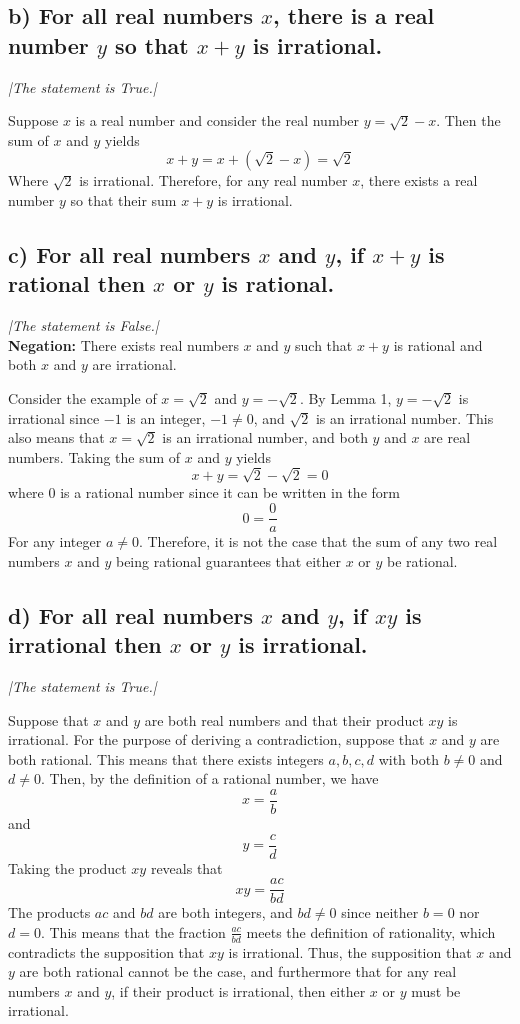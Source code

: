 \documentclass[11pt, letterpaper]{article}
\begin{document}
\subsection*{b) For all real numbers $x$, there is a real number $y$ so that $x+y$ is irrational.}
{\large\it |The statement is True.|}
\begin{prf}
    Suppose $x$ is a real number and consider the real number $y=\sqrt{2}-x$. Then the sum of $x$ and $y$ yields
    \[x+y=x+(\sqrt{2}-x)=\sqrt{2}\]
    Where $\sqrt{2}$ is irrational. Therefore, for any real number $x$, there exists a real number $y$ so that their sum
    $x+y$ is irrational.
\end{prf}

\subsection*{c) For all real numbers $x$ and $y$, if $x+y$ is rational then $x$ or $y$ is rational.}
{\large\it |The statement is False.|}\\[0.25cm]
{\bf Negation:} There exists real numbers $x$ and $y$ such that $x+y$ is rational and both $x$ and $y$ are irrational.
\begin{prf}
    Consider the example of $x=\sqrt{2}$ and $y=-\sqrt{2}$. By Lemma 1, $y=-\sqrt{2}$ is
    irrational since $-1$ is an integer, $-1\neq 0$, and $\sqrt{2}$ is an irrational number. This also means that $x=\sqrt{2}$ is 
    an irrational number, and both $y$ and $x$ are real numbers. Taking the sum of $x$ and $y$ yields
    \[x+y=\sqrt{2}-\sqrt{2}=0\]
    where 0 is a rational number since it can be written in the form
    \[0=\frac{0}{a}\]
    For any integer $a\neq 0$. Therefore, it is not the case that the sum of any two real numbers $x$ and $y$ being rational
    guarantees that either $x$ or $y$ be rational.
\end{prf}

\subsection*{d) For all real numbers $x$ and $y$, if $xy$ is irrational then $x$ or $y$ is irrational.}
{\large\it |The statement is True.|}
\begin{prf}[by contradiction]
    Suppose that $x$ and $y$ are both real numbers and that their product $xy$ is irrational. For the purpose of deriving a contradiction,
    suppose that $x$ and $y$ are both rational. This means that there exists integers $a,b,c,d$ with both $b\neq 0$ and $d\neq 0$.
    Then, by the definition of a rational number, we have
    \[x=\frac{a}{b}\]
    and 
    \[y=\frac{c}{d}\] 
    Taking the product $xy$ reveals that
    \[xy=\frac{ac}{bd}\] 
    The products $ac$ and $bd$ are both integers, and $bd\neq 0$ since neither $b=0$ nor $d=0$. This means that the fraction
    $\frac{ac}{bd}$ meets the definition of rationality, which contradicts the supposition that $xy$ is irrational. Thus, the supposition
    that $x$ and $y$ are both rational cannot be the case, and furthermore that for any real numbers $x$ and $y$, if their product
    is irrational, then either $x$ or $y$ must be irrational. 
\end{prf}
\end{document}
